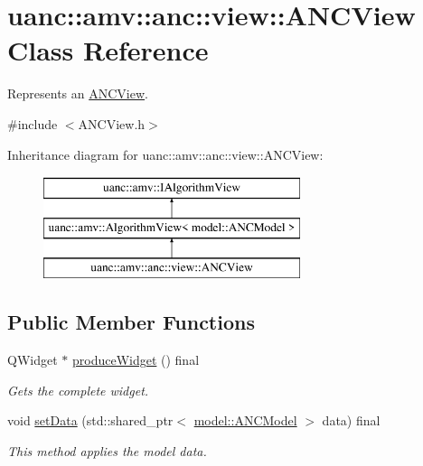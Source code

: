 \hypertarget{classuanc_1_1amv_1_1anc_1_1view_1_1_a_n_c_view}{}\section{uanc\+:\+:amv\+:\+:anc\+:\+:view\+:\+:A\+N\+C\+View Class Reference}
\label{classuanc_1_1amv_1_1anc_1_1view_1_1_a_n_c_view}


Represents an \hyperlink{classuanc_1_1amv_1_1anc_1_1view_1_1_a_n_c_view}{A\+N\+C\+View}.  




{\ttfamily \#include $<$A\+N\+C\+View.\+h$>$}

Inheritance diagram for uanc\+:\+:amv\+:\+:anc\+:\+:view\+:\+:A\+N\+C\+View\+:\begin{figure}[H]
\begin{center}
\leavevmode
\includegraphics[height=3.000000cm]{classuanc_1_1amv_1_1anc_1_1view_1_1_a_n_c_view}
\end{center}
\end{figure}
\subsection*{Public Member Functions}
\begin{DoxyCompactItemize}
\item 
Q\+Widget $\ast$ \hyperlink{classuanc_1_1amv_1_1anc_1_1view_1_1_a_n_c_view_ab8ad6046c26c2eae15edc82fdbae9aa1}{produce\+Widget} () final
\begin{DoxyCompactList}\small\item\em Gets the complete widget. \end{DoxyCompactList}\item 
void \hyperlink{classuanc_1_1amv_1_1anc_1_1view_1_1_a_n_c_view_ac9ca194090e787bbe03bb9aec74a7bf4}{set\+Data} (std\+::shared\+\_\+ptr$<$ \hyperlink{classuanc_1_1amv_1_1anc_1_1model_1_1_a_n_c_model}{model\+::\+A\+N\+C\+Model} $>$ data) final
\begin{DoxyCompactList}\small\item\em This method applies the model data. \end{DoxyCompactList}\end{DoxyCompactItemize}


